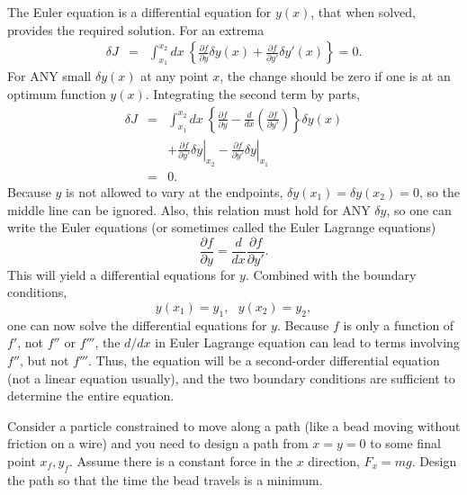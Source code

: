The Euler equation is a differential equation for $y(x)$, that when
solved, provides the required solution. For an extrema
\begin{eqnarray}
\delta J&=&\int_{x_1}^{x_2}dx~\left\{ \frac{\partial f}{\partial
  y}\delta y(x)+\frac{\partial f}{\partial y'}\delta y'(x)\right\}=0.
\end{eqnarray}
For ANY small $\delta y(x)$ at any point $x$, the change should be
zero if one is at an optimum function $y(x)$. Integrating the second
term by parts,
\begin{eqnarray}
\delta J&=&\int_{x_1}^{x_2}dx~\left\{ \frac{\partial f}{\partial
  y}-\frac{d}{dx}\left(\frac{\partial f}{\partial
  y'}\right)\right\}\delta y(x)\\ \nonumber &&+\left.\frac{\partial
  f}{\partial y'}\delta y\right|_{x_2}-\left.\frac{\partial
  f}{\partial y'}\delta y\right|_{x_1}\\ \nonumber &=&0.
\end{eqnarray}
Because $y$ is not allowed to vary at the endpoints, $\delta
y(x_1)=\delta y(x_2)=0$, so the middle line can be ignored.  Also,
this relation must hold for ANY $\delta y$, so one can write the Euler
equations (or sometimes called the Euler Lagrange equations)
\begin{equation}
\label{eq:el}
\frac{\partial f}{\partial y}=\frac{d}{dx}\frac{\partial f}{\partial
  y'}.
\end{equation}
This will yield a differential equations for $y$. Combined with the
boundary conditions,
\begin{equation}
y(x_1)=y_1, ~~~y(x_2)=y_2,
\end{equation}
one can now solve the differential equations for $y$. Because $f$ is
only a function of $f'$, not $f''$ or $f'''$, the $d/dx$ in Euler
Lagrange equation can lead to terms involving $f''$, but not
$f'''$. Thus, the equation will be a second-order differential
equation (not a linear equation usually), and the two boundary
conditions are sufficient to determine the entire equation.

\example\label{ex:brachiostone}\noindent Consider a particle
constrained to move along a path (like a bead moving without friction
on a wire) and you need to design a path from $x=y=0$ to some final
point $x_f,y_f$. Assume there is a constant force in the $x$
direction, $F_x=mg$. Design the path so that the time the bead travels
is a minimum.

